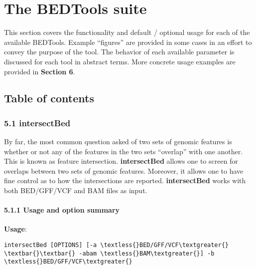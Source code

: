 \documentclass[letterpaper,10pt,english]{sphinxmanual}
\begin{document}
\section{The BEDTools suite}
\label{content/bedtools-suite:the-bedtools-suite}\label{content/bedtools-suite::doc}
This section covers the functionality and default / optional usage for each of the available BEDTools.
Example ``figures'' are provided in some cases in an effort to convey the purpose of the tool. The
behavior of each available parameter is discussed for each tool in abstract terms. More concrete usage
examples are provided in \textbf{Section 6}.


\subsection{Table of contents}
\label{content/bedtools-suite:table-of-contents}

\subsubsection{5.1 intersectBed}
\label{content/intersectBed:intersectbed}\label{content/intersectBed::doc}
By far, the most common question asked of two sets of genomic features is whether or not any of the
features in the two sets ``overlap'' with one another. This is known as feature intersection. \textbf{intersectBed}
allows one to screen for overlaps between two sets of genomic features. Moreover, it allows one to have
fine control as to how the intersections are reported. \textbf{intersectBed} works with both BED/GFF/VCF
and BAM files as input.


\paragraph{5.1.1 Usage and option summary}
\label{content/intersectBed:usage-and-option-summary}
\textbf{Usage}:

\begin{Verbatim}[commandchars=\\\{\}]
intersectBed [OPTIONS] [-a \textless{}BED/GFF/VCF\textgreater{} \textbar{}\textbar{} -abam \textless{}BAM\textgreater{}] -b \textless{}BED/GFF/VCF\textgreater{}
\end{Verbatim}
\end{document}
